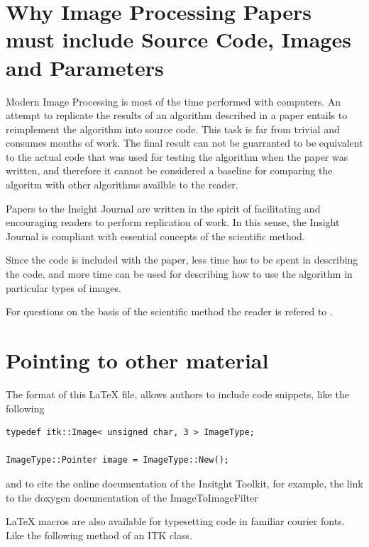 \documentclass{InsightArticle}
\begin{document}
\section{Why Image Processing Papers must include Source Code, Images and Parameters }

Modern Image Processing is most of the time performed with computers. An
attempt to replicate the results of an algorithm described in a paper entails
to reimplement the algorithm into source code. This task is far from trivial
and consumes months of work. The final result can not be guarranted to be
equivalent to the actual code that was used for testing the algorithm when the
paper was written, and therefore it cannot be considered a baseline for
comparing the algoritm with other algorithms availble to the reader.

Papers to the Insight Journal are written in the spirit of facilitating and
encouraging readers to perform replication of work. In this sense, the Insight
Journal is compliant with essential concepts of the scientific method.

Since the code is included with the paper, less time has to be spent in
describing the code, and more time can be used for describing how to use the
algorithm in particular types of images.

For questions on the basis of the scientific method the reader is refered to
\cite{Popper2002,Popper1971}.



\section{Pointing to other material}

The format of this LaTeX file, allows authors to include code snippets, like
the following

\small
\begin{verbatim}
typedef itk::Image< unsigned char, 3 > ImageType;

ImageType::Pointer image = ImageType::New();
\end{verbatim}
\normalsize

and to cite the online documentation of the Insitght Toolkit, for example, the
link to the doxygen documentation of the ImageToImageFilter


LaTeX macros are also available for typesetting code in familiar courier fonts.
Like the following method of an ITK class.
\end{document}
